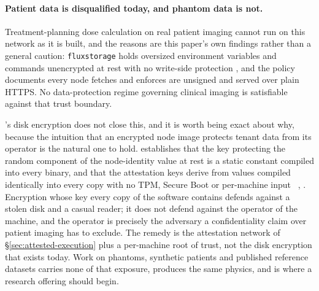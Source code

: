\paragraph{Patient data is disqualified today, and phantom data is not.} Treatment-planning dose
calculation on real patient imaging cannot run on this network as it is built, and the reasons are
this paper's own findings rather than a general caution: 
\texttt{fluxstorage} holds oversized environment variables and commands unencrypted at rest with no
write-side protection , and the
policy documents every node fetches and enforces are unsigned and served over plain HTTPS. No
data-protection regime governing clinical imaging is satisfiable against that trust boundary.

\ArcaneOS{}'s disk encryption does not close this, and it is worth being exact about why, because the
intuition that an encrypted node image protects tenant data from its operator is the natural one to
hold.  establishes that the key protecting the random component of the
node-identity value at rest is a static constant compiled into every \fluxsas{} binary, and that the
attestation keys derive from values compiled identically into every copy with no TPM, Secure Boot or
per-machine input
\shipped~,
. Encryption whose key every copy
of the software contains defends against a stolen disk and a casual reader; it does not defend
against the operator of the machine, and the operator is precisely the adversary a confidentiality
claim over patient imaging has to exclude. The remedy is the attestation network of
\S\ref{sec:attested-execution} plus a per-machine root of trust, not the disk encryption that exists
today. Work on
phantoms, synthetic patients and published reference datasets carries none of that exposure, produces
the same physics, and is where a research offering should begin.

\FloatBarrier
